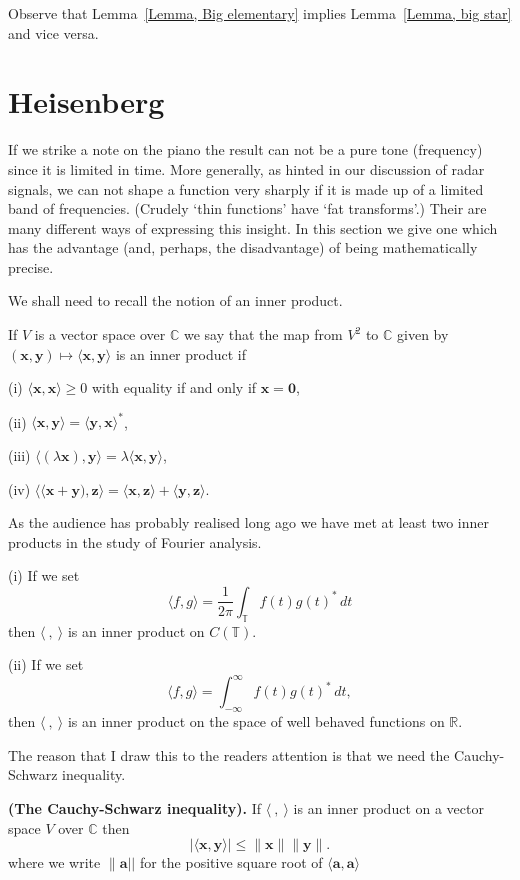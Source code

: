 Observe that Lemma~\ref{Lemma, Big elementary}
implies Lemma~\ref{Lemma, big star} and vice versa.
\section{Heisenberg} If we strike a note on the piano
the result can not be a pure tone (frequency) since
it is limited in time. More generally, as hinted in our discussion
of radar signals, we can not shape a function very
sharply if it is made up of a limited band of frequencies.
(Crudely `thin functions' have `fat transforms'.)
Their are many different ways of expressing this insight.
In this section we give one which has the advantage
(and, perhaps, the disadvantage) of being mathematically
precise.

We shall need to recall the notion of an inner product.
\begin{definition} If $V$ is a vector space over ${\mathbb C}$
we say that the map from $V^{2}$ to ${\mathbb C}$ given by
$({\mathbf x},{\mathbf y})\mapsto
\langle {\mathbf x},{\mathbf y}\rangle$ is an inner product if

(i) $\langle {\mathbf x},{\mathbf x}\rangle\geq 0$ with equality
if and only if ${\mathbf x}={\mathbf 0}$,

(ii) $\langle{\mathbf x},{\mathbf y}\rangle
=\langle{\mathbf y},{\mathbf x}\rangle^{*}$,

(iii) $\langle(\lambda{\mathbf x}),{\mathbf y}\rangle=
\lambda\langle{\mathbf x},{\mathbf y}\rangle$,

(iv) $\langle\langle{\mathbf x}+{\mathbf y}),{\mathbf z}\rangle
=\langle{\mathbf x},{\mathbf z}\rangle+
\langle{\mathbf y},{\mathbf z}\rangle.$
\end{definition}
As the audience has probably realised long ago we
have met at least two inner products in the study
of Fourier analysis.
\begin{lemma} (i) If we set
\[\langle f,g \rangle=\frac{1}{2\pi}\int_{\mathbb T}f(t)g(t)^{*}\,dt\]
then $\langle\ ,\ \rangle$ is an inner product on $C({\mathbb T})$.

(ii) If we set
\[\langle f,g \rangle=\int_{-\infty}^{\infty}f(t)g(t)^{*}\,dt,\]
then $\langle\ ,\ \rangle$ is an inner product on the space
of well behaved functions on ${\mathbb R}$.
\end{lemma}
The reason that I draw this to the readers attention is
that we need the Cauchy-Schwarz inequality.
\begin{lemma}{\bf (The Cauchy-Schwarz inequality).}%
\label{Cauchy-Schwarz}
If $\langle\ ,\ \rangle$ is an inner product on a vector space $V$
over ${\mathbb C}$
then
\[|\langle{\mathbf x},{\mathbf y}\rangle|\leq
\|{\mathbf x}\| \|{\mathbf y}\|.\]
where we write $\|{\mathbf a}||$ for the positive square root
of $\langle{\mathbf a},{\mathbf a}\rangle$
\end{lemma}


